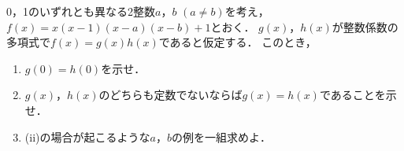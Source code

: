 \documentclass[../../main.tex]{subfiles}
\begin{document}
0，1のいずれとも異なる2整数$a$，$b$ $(a \neq b)$を考え，$f(x)=x(x-1)(x-a)(x-b)+1$とおく．
$g(x)$，$h(x)$が整数係数の多項式で$f(x)=g(x)h(x)$であると仮定する．
このとき，
\begin{enumerate}
  \item[(i)] $g(0)=h(0)$を示せ．
  \item[(ii)] $g(x)$，$h(x)$のどちらも定数でないならば$g(x)=h(x)$であることを示せ．
  \item[(iii)] (ii)の場合が起こるような$a$，$b$の例を一組求めよ．
\end{enumerate}
\end{document}
